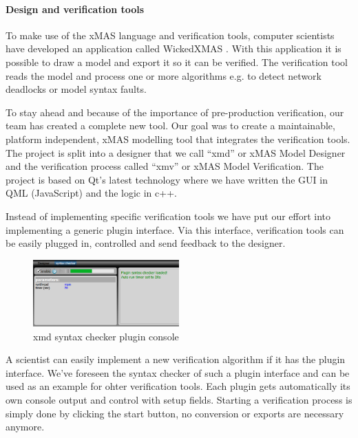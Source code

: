 \paragraph{Design and verification tools}

To make use of the xMAS language and verification tools, computer scientists
have developed an application called WickedXMAS \cite{WickedXmas}.
With this application it is possible to draw a model and export it so it can be
verified. The verification tool reads the model and process one or more
algorithms e.g. to detect network deadlocks or model syntax faults.

To stay ahead and because of the importance of pre-production verification, our
team has created a complete new tool. Our goal was to create a maintainable,
platform independent, xMAS modelling tool that integrates the verification
tools. The project is split into a designer that we call ``xmd'' or xMAS Model
Designer and the verification process called ``xmv'' or xMAS Model Verification. The
project is based on Qt's latest technology where we have written the GUI in QML
(JavaScript) and the logic in c++.

Instead of implementing specific verification tools we have put our effort into
implementing a generic plugin interface. Via this interface, verification tools
can be easily plugged in, controlled and send feedback to the designer. 
\begin{figure}
  \vspace{-20pt}
  \begin{center}
    \includegraphics[width=0.50\textwidth]{console}
  \end{center}
  \vspace{-20pt}
  \caption{xmd syntax checker plugin console}
  \label{fig:console}
  \vspace{-10pt}
\end{figure}
A scientist can easily implement a new verification algorithm if it has the plugin
interface. We've foreseen the syntax checker of such a plugin interface and can
be used as an example for ohter verification tools. 
Each plugin gets automatically its own console output and
control with setup fields. Starting a verification process is simply done by
clicking the start button, no conversion or exports are necessary anymore.


